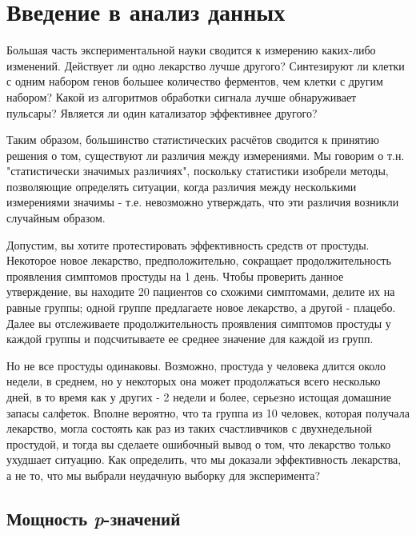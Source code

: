 

\chapter{Введение в анализ данных}
\label{chp2}

Большая часть экспериментальной науки сводится к измерению каких-либо изменений. Действует ли одно лекарство лучше другого? Синтезируют ли клетки с одним набором генов большее количество ферментов, чем клетки с другим набором? Какой из алгоритмов обработки сигнала лучше обнаруживает пульсары? Является ли один катализатор эффективнее другого?

Таким образом, большинство статистических расчётов сводится к принятию решения о том, существуют ли различия между измерениями. Мы говорим о т.н. "статистически значимых различиях"\hspace{1pt}, поскольку статистики изобрели методы, позволяющие определять ситуации, когда различия между несколькими измерениями значимы - т.е. невозможно утверждать, что эти различия возникли случайным образом.

Допустим, вы хотите протестировать эффективность средств от простуды. Некоторое новое лекарство, предположительно, сокращает продолжительность проявления симптомов простуды на 1 день. Чтобы проверить данное утверждение, вы находите 20 пациентов со схожими симптомами, делите их на равные группы; одной группе предлагаете новое лекарство, а другой - плацебо. Далее вы отслеживаете продолжительность проявления симптомов простуды у каждой группы и подсчитываете ее среднее значение для каждой из групп.

Но не все простуды одинаковы. Возможно, простуда у человека длится около недели, в среднем, но у некоторых она может продолжаться всего несколько дней, в то время как у других - 2 недели и более, серьезно истощая домашние запасы салфеток. Вполне вероятно, что та группа из 10 человек, которая получала лекарство, могла состоять как раз из таких счастливчиков с двухнедельной простудой, и тогда вы сделаете ошибочный вывод о том, что лекарство только ухудшает ситуацию.  Как определить, что мы доказали эффективность лекарства, а не то, что мы выбрали неудачную выборку для эксперимента?

\section{Мощность \emph{p}-значений}
\label{chp2:pvalues}

